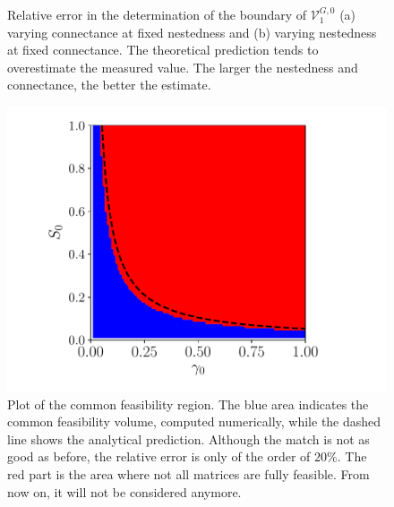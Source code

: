 \documentclass[12pt, titlepage]{report}
\begin{document}
\begin{figure}[h!]
	\captionsetup[subfigure]{captionskip = -165pt, margin = 45pt}
\captionsetup[subfigure]{captionskip = -175pt, margin = 45pt}
\caption{Relative error in the determination of the boundary of $\mathcal{V}^{G,0}_1$ (a) varying connectance at fixed nestedness and (b) varying nestedness at fixed connectance. The theoretical prediction tends to overestimate the measured value. The larger the nestedness and connectance, the better the estimate.}\label{fig: deviation away from theory feasibility}
\end{figure}
\begin{figure}[h!]
\centering
\includegraphics[width=0.7\linewidth]{common_feasibility_volume_no_syntrophy}
\caption{Plot of the common feasibility region. The blue area indicates the common feasibility volume, computed numerically, while the dashed line shows the analytical prediction. Although the match is not as good as before, the relative error is only of the order of $20 \%$. The red part is the area where not all matrices are fully feasible. From now on, it will not be considered anymore.}
\label{fig: common feasible volume}
\end{figure}
\end{document}
